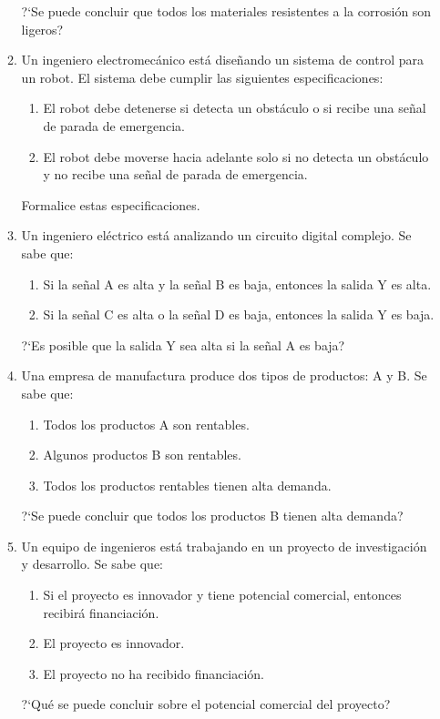 \begin{enumerate}[label=\textbf{\arabic*}.]
\begin{enumerate}
		?`Se puede concluir que todos los materiales resistentes a la corrosión son ligeros?
		
		\item Un ingeniero electromecánico está diseñando un sistema de control para un robot. El sistema debe cumplir las siguientes especificaciones:
		\begin{enumerate}[itemsep=-3pt, label=\roman*)]
			\item El robot debe detenerse si detecta un obstáculo o si recibe una señal de parada de emergencia.
			\item El robot debe moverse hacia adelante solo si no detecta un obstáculo y no recibe una señal de parada de emergencia.
		\end{enumerate}
		Formalice estas especificaciones.
		
		\item Un ingeniero eléctrico está analizando un circuito digital complejo. Se sabe que:
		\begin{enumerate}[itemsep=-3pt, label=\roman*)]
			\item Si la señal A es alta y la señal B es baja, entonces la salida Y es alta.
			\item Si la señal C es alta o la señal D es baja, entonces la salida Y es baja.
		\end{enumerate}
		?`Es posible que la salida Y sea alta si la señal A es baja?
		
		\item Una empresa de manufactura produce dos tipos de productos: A y B. Se sabe que:
		
		\begin{enumerate}[itemsep=-3pt, label=\roman*)]
			\item Todos los productos A son rentables.
			\item Algunos productos B son rentables.
			\item Todos los productos rentables tienen alta demanda.
		\end{enumerate}
		?`Se puede concluir que todos los productos B tienen alta demanda?
		
		\item Un equipo de ingenieros está trabajando en un proyecto de investigación y desarrollo. Se sabe que:
		\begin{enumerate}[itemsep=-3pt, label=\roman*)]
			\item Si el proyecto es innovador y tiene potencial comercial, entonces recibirá financiación.
			\item El proyecto es innovador.
			\item El proyecto no ha recibido financiación.
		\end{enumerate}
		?`Qué se puede concluir sobre el potencial comercial del proyecto?
	\end{enumerate}
	

\end{enumerate}
